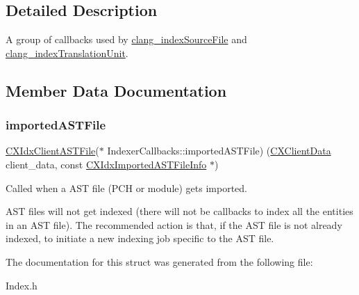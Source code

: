 \subsection{Detailed Description}
A group of callbacks used by \hyperlink{group__CINDEX__HIGH_gaa5c2ad8979779c401b91110d444e2be6}{clang\+\_\+index\+Source\+File} and \hyperlink{group__CINDEX__HIGH_gab12a0795c7d7be6e7ec85679faf3f8e9}{clang\+\_\+index\+Translation\+Unit}. 

\subsection{Member Data Documentation}
\mbox{\label{structIndexerCallbacks_a75672a9934f69854080bee3fbc0e3994}} 
\subsubsection{\texorpdfstring{imported\+A\+S\+T\+File}{importedASTFile}}
{\footnotesize\ttfamily \hyperlink{group__CINDEX__HIGH_ga802a69b3db636a25c5d434585fce9cbd}{C\+X\+Idx\+Client\+A\+S\+T\+File}($\ast$ Indexer\+Callbacks\+::imported\+A\+S\+T\+File) (\hyperlink{group__CINDEX_gacfa40c3de26d228c0d898403c2c21612}{C\+X\+Client\+Data} client\+\_\+data, const \hyperlink{structCXIdxImportedASTFileInfo}{C\+X\+Idx\+Imported\+A\+S\+T\+File\+Info} $\ast$)}



Called when a A\+ST file (P\+CH or module) gets imported. 

A\+ST files will not get indexed (there will not be callbacks to index all the entities in an A\+ST file). The recommended action is that, if the A\+ST file is not already indexed, to initiate a new indexing job specific to the A\+ST file. 

The documentation for this struct was generated from the following file\+:\begin{DoxyCompactItemize}
\item 
Index.\+h\end{DoxyCompactItemize}

